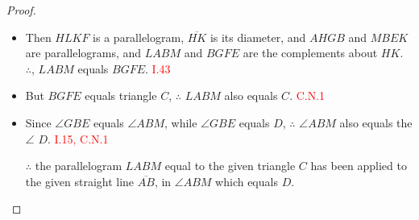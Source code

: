 \begin{con}
\begin{enumerate}
\begin{figure}[H]    
	\caption{}
\end{figure} 
  
  \end{enumerate}
  
  \end{con}
  
  \begin{proof}
  
  \begin{itemize}
  
  \item Then $HLKF$ is a parallelogram, $\overline{HK}$ is its diameter, and $AHGB$ and $MBEK$ are parallelograms, and $LABM$ and $BGFE$ are the complements about $HK$. $\therefore$, $LABM$ equals $BGFE$. \hfill\textcolor{red}{ I.43}
  
  \item But $BGFE$ equals triangle $C$, $\therefore$ $LABM$ also equals $C$.\hfill\textcolor{red}{  C.N.1}
  
 \item Since $\angle{GBE}$ equals $\angle{ABM}$, while $\angle{GBE}$ equals $D$, $\therefore$ $\angle{ABM}$ also equals the $\angle$ $D$. \hfill\textcolor{red}{ I.15, C.N.1}
  
  \item[$\therefore$] the parallelogram $LABM$ equal to the given triangle $C$ has been applied to the given straight line $\overline{AB}$, in $\angle{ABM}$ which equals $D$. 

\end{itemize}%

\end{proof}%

\clearpage
